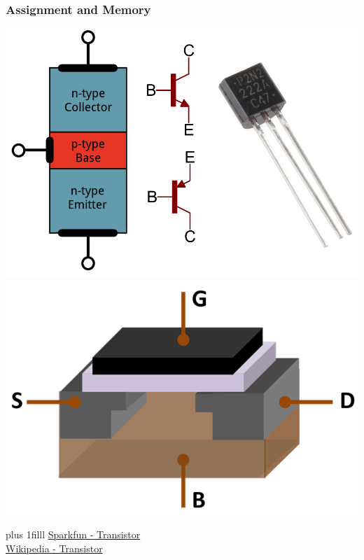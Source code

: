 \documentclass[fleqn]{beamer} %
\newcommand{\sectiontitleIII}{Assignment and Memory}
\newcommand{\btVFill}{\vskip0pt plus 1filll}
\begin{document}
	\begin{frame}[label=sectionIII] \small
	\frametitle{\sectiontitleIII}
	
	\includegraphics[scale=.15]{transistor_pnp}
	\includegraphics[scale=.25]{MOSFET_Structure.png}
	
	\btVFill
	\href{https://learn.sparkfun.com/tutorials/transistors/all}{Sparkfun - Transistor} \\
	\href{https://en.wikipedia.org/wiki/Transistor}{Wikipedia - Transistor}
	
	\end{frame}
\end{document}
